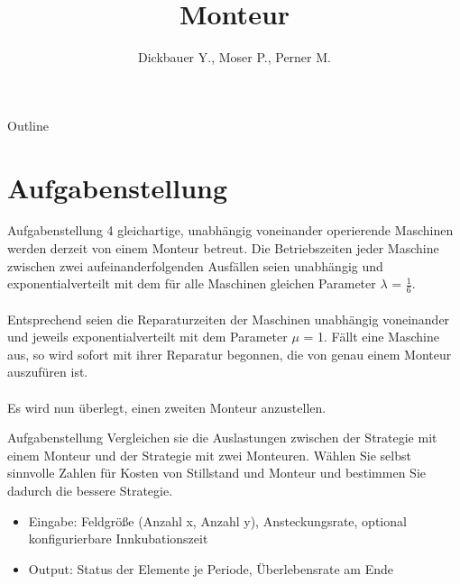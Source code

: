 

\title[BSP28 - Monteur]{Monteur}
\author{Dickbauer Y., Moser P., Perner M.}



\begin{frame}
  \titlepage
\end{frame}

\begin{frame}{Outline}
  \tableofcontents
\end{frame}

\section{Aufgabenstellung}
\begin{frame}{Aufgabenstellung}
4 gleichartige, unabhängig voneinander operierende Maschinen werden derzeit von einem
Monteur betreut. Die Betriebszeiten jeder Maschine zwischen zwei aufeinanderfolgenden
Ausfällen seien unabhängig und exponentialverteilt mit dem für alle Maschinen gleichen
Parameter $\lambda$ = $\frac{1}{6}$.
\\~\\
Entsprechend seien die Reparaturzeiten der Maschinen unabhängig
voneinander und jeweils exponentialverteilt mit dem Parameter $\mu$ = 1. Fällt eine Maschine
aus, so wird sofort mit ihrer Reparatur begonnen, die von genau einem Monteur
auszufüren ist.
\\~\\
Es wird nun überlegt, einen zweiten Monteur anzustellen.
\end{frame}

\begin{frame}{Aufgabenstellung}
Vergleichen sie die Auslastungen zwischen der Strategie mit einem Monteur und der Strategie
mit zwei Monteuren. Wählen Sie selbst sinnvolle Zahlen für Kosten von Stillstand
und Monteur und bestimmen Sie dadurch die bessere Strategie.
\vspace{1cm}
\begin{itemize}
  \item Eingabe: Feldgröße (Anzahl x, Anzahl y), Ansteckungsrate, optional konfigurierbare Innkubationszeit
  \item Output: Status der Elemente je Periode, Überlebensrate am Ende
\end{itemize}
\end{frame}

